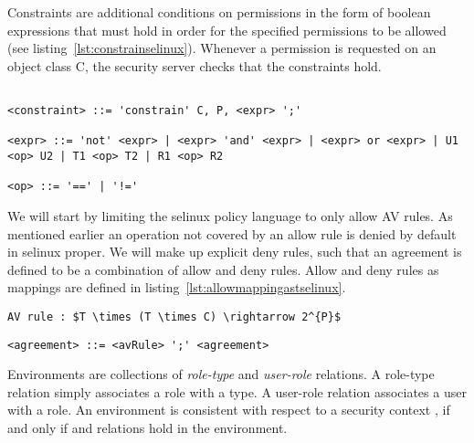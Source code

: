 Constraints are additional conditions on permissions in the form of boolean expressions that must hold in order for the specified permissions to be allowed (see listing~\ref{lst:constrainselinux}). Whenever a permission is requested on an object class C, the security server checks that the constraints hold.

\lstset{language=selinux}
\begin{lstlisting}[frame=single, caption={Constraint Definition},label={lst:constrainselinux}]

<constraint> ::= 'constrain' C, P, <expr> ';'

<expr> ::= 'not' <expr> | <expr> 'and' <expr> | <expr> or <expr> | U1 <op> U2 | T1 <op> T2 | R1 <op> R2

<op> ::= '==' | '!='
\end{lstlisting}


We will start by limiting the \ac{selinux} policy language to only allow AV rules. As mentioned earlier an operation not covered by an allow rule is denied by default in \ac{selinux} proper. We will make up explicit deny rules, such that an agreement is defined to be a combination of allow and deny rules. Allow and deny rules as mappings are defined in listing~\ref{lst:allowmappingastselinux}.

\lstset{language=AST}
\begin{lstlisting}[frame=single, caption={'allow'/'deny' Rule as a Mapping},label={lst:allowmappingastselinux}]
AV rule : $T \times (T \times C) \rightarrow 2^{P}$
\end{lstlisting}

\lstset{language=AST}
\begin{lstlisting}[frame=single, caption={\ac{selinux} Agreement},label={lst:agreementastselinux}]
<agreement> ::= <avRule> ';' <agreement> 
\end{lstlisting}



Environments are collections of \emph{role-type} and \emph{user-role} relations. A role-type relation  simply associates a role with a type. A user-role relation  associates a user with a role. An environment is consistent with respect to a security context , if and only if  and  relations hold in the environment. 

